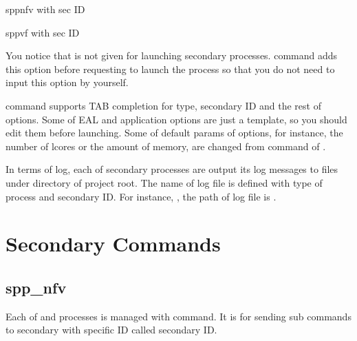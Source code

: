 \documentclass[a4paper,11pt,openany,oneside,english]{sphinxmanual}
\begin{document}
\begin{sphinxVerbatim}[commandchars=\\\{\},formatcom=\footnotesize]
 spp\PYGZus{}nfv with sec ID 

 spp\PYGZus{}vf with sec ID 
\end{sphinxVerbatim}

You notice that  is not given for launching secondary
processes.  command adds this option before requesting to launch
the process so that you do not need to input this option by yourself.

 command supports TAB completion for type, secondary ID and the rest
of options. Some of EAL and application options are just a template, so you
should edit them before launching. Some of default params of options,
for instance, the number of lcores or the amount of memory, are changed from
 command of {\hyperref[\detokenize{commands/common:commands-common-config}]{}}.

In terms of log, each of secondary processes are output its log messages to
files under  directory of project root. The name of log file is defined
with type of process and secondary ID. For instance, , the path of log
file is .


\section{Secondary Commands}
\label{\detokenize{commands/secondary/index:secondary-commands}}\label{\detokenize{commands/secondary/index::doc}}

\subsection{spp\_nfv}
\label{\detokenize{commands/secondary/spp_nfv:spp-nfv}}\label{\detokenize{commands/secondary/spp_nfv:commands-spp-nfv}}\label{\detokenize{commands/secondary/spp_nfv::doc}}
Each of  and  processes is managed with  command.
It is for sending sub commands to secondary with specific ID called
secondary ID.
\end{document}

